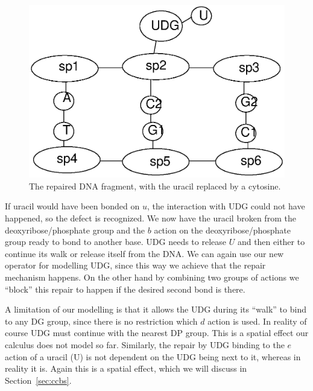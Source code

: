 \documentclass[review]{elsarticle}
\begin{document}
\begin{figure}[h!]
  \centering
    \includegraphics[width=1.0\textwidth]{ber/ber2}
  \caption[The repaired DNA fragment.]{The repaired DNA fragment, with the uracil replaced by a cytosine.}
  \label{fig:ber2}
\end{figure}

If uracil would have been bonded on $u$, the interaction with UDG could not have happened, so the defect is recognized. We now have the uracil broken from the deoxyribose/phosphate group and the $b$ action on the deoxyribose/phosphate group ready to bond to another base. UDG needs to release $U$ and then either to continue its walk or release itself from the DNA. We can again use our new operator for modelling UDG, since this way we achieve that the repair mechanism happens. On the other hand by combining two groups of actions we ``block'' this repair to happen if the desired second bond is there.

A limitation of our modelling is that it allows the UDG during its ``walk'' to bind to any DG group, since there is no restriction which $d$ action is used. In reality of course UDG must continue with the nearest DP group. This is a spatial effect our calculus does not model so far. Similarly, the repair by UDG binding to the $e$ action of a uracil (U) is not dependent on the UDG being next to it, whereas in reality it is. Again this is a spatial effect, which we will discuss in Section~\ref{sec:ccbs}.
\end{document}
